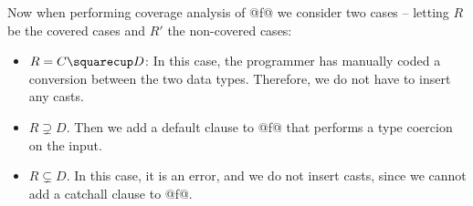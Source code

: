 Now when performing coverage analysis of @f@ we consider two cases --
letting $R$ be the covered cases and $R'$ the non-covered cases:
\begin{itemize}
  \item $R = C \squarecup D$: In this case, the programmer has manually
    coded a conversion between the two data types. Therefore, we do not
    have to insert any casts.
  \item $R \supsetneq D$. Then we add a default clause to @f@ that performs
    a type coercion on the input.
  \item $R \subsetneq D$. In this case, it is an error, and we do not
    insert casts, since we cannot add a catchall clause to @f@.
\end{itemize}































































